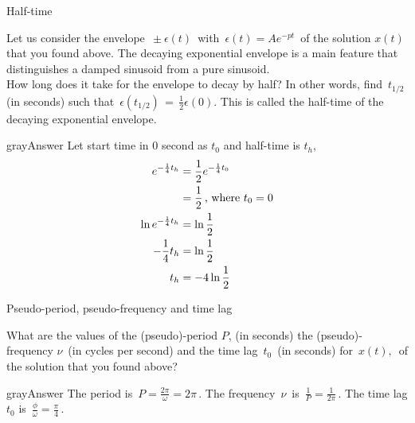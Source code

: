 \begin{problem}
  Half-time
\end{problem}
Let us consider the envelope $\, \pm \epsilon (t)\,$ with
$\, \epsilon (t)=Ae^{-pt}\,$ of the solution $x(t)$ that you found above.
The decaying exponential envelope is a main feature that distinguishes
a damped sinusoid from a pure sinusoid.\\

How long does it take for the envelope to decay by half? In other words, find
$\, t_{1/2}\,$ (in seconds) such that
$\, \displaystyle \epsilon \left(t_{1/2}\right)\, =\, \frac{1}{2} \epsilon (0).$
This is called the {\color{blue}half-time} of the decaying exponential envelope.

\begin{mybox}{gray}{Answer}
  Let start time in 0 second as $t_0$ and half-time is $t_h$,
  \begin{align*}
    \displaystyle e^{-\frac{1}{4} t_h}
    \displaystyle &= \displaystyle \frac{1}{2} e^{-\frac{1}{4} t_0} \\
    \displaystyle &= \displaystyle \frac{1}{2}  \, \text{, where } t_0 = 0\\
    \displaystyle \ln {e^{-\frac{1}{4} t_h}}
    \displaystyle &= \displaystyle \ln{\frac{1}{2}} \\
    \displaystyle -\frac{1}{4} t_h \displaystyle &= \displaystyle \ln{\frac{1}{2}} \\
    \displaystyle t_h \displaystyle &= \displaystyle -4 \ln{\frac{1}{2}} 
  \end{align*}
\end{mybox}

\begin{problem}
  Pseudo-period, pseudo-frequency and time lag
\end{problem}
What are the values of the (pseudo)-period $P$,
(in seconds) the (pseudo)-frequency $\nu \,$
(in cycles per second) and the time lag $\, t_0 \,$ (in seconds) for
$\,x(t) ,\,$ of the solution that you found above?

\begin{mybox}{gray}{Answer}
  The period is $\, P = \frac{2 \pi}{\omega} = 2 \pi \,$.
  The frequency $\, \nu \,$ is $\, \frac{1}{P} = \frac{1}{2 \pi} \,$.
  The time lag $t_0$ is $\, \frac{\phi}{\omega} = \frac{\pi}{4} \,$. 
\end{mybox}
\clearpage

